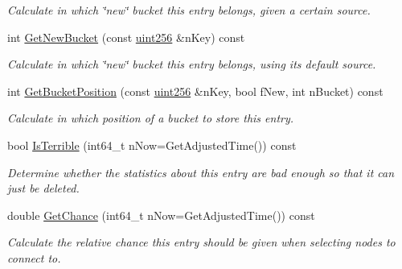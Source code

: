 \begin{DoxyCompactItemize}
\begin{DoxyCompactList}\small\item\em Calculate in which \char`\"{}new\char`\"{} bucket this entry belongs, given a certain source. \end{DoxyCompactList}\item 
\mbox{\label{class_c_addr_info_a04ac79764971242edce1e82aefb2aea0}} 
int \mbox{\hyperlink{class_c_addr_info_a04ac79764971242edce1e82aefb2aea0}{Get\+New\+Bucket}} (const \mbox{\hyperlink{classuint256}{uint256}} \&n\+Key) const
\begin{DoxyCompactList}\small\item\em Calculate in which \char`\"{}new\char`\"{} bucket this entry belongs, using its default source. \end{DoxyCompactList}\item 
\mbox{\label{class_c_addr_info_a3a133ffb3fbf67cbeb5f4bc683fa9126}} 
int \mbox{\hyperlink{class_c_addr_info_a3a133ffb3fbf67cbeb5f4bc683fa9126}{Get\+Bucket\+Position}} (const \mbox{\hyperlink{classuint256}{uint256}} \&n\+Key, bool f\+New, int n\+Bucket) const
\begin{DoxyCompactList}\small\item\em Calculate in which position of a bucket to store this entry. \end{DoxyCompactList}\item 
\mbox{\label{class_c_addr_info_a600725db90b879aee92128a3409af8aa}} 
bool \mbox{\hyperlink{class_c_addr_info_a600725db90b879aee92128a3409af8aa}{Is\+Terrible}} (int64\+\_\+t n\+Now=Get\+Adjusted\+Time()) const
\begin{DoxyCompactList}\small\item\em Determine whether the statistics about this entry are bad enough so that it can just be deleted. \end{DoxyCompactList}\item 
\mbox{\label{class_c_addr_info_af6788fe5a5364e63896ab9dedb8e5d40}} 
double \mbox{\hyperlink{class_c_addr_info_af6788fe5a5364e63896ab9dedb8e5d40}{Get\+Chance}} (int64\+\_\+t n\+Now=Get\+Adjusted\+Time()) const
\begin{DoxyCompactList}\small\item\em Calculate the relative chance this entry should be given when selecting nodes to connect to. \end{DoxyCompactList}\end{DoxyCompactItemize}

